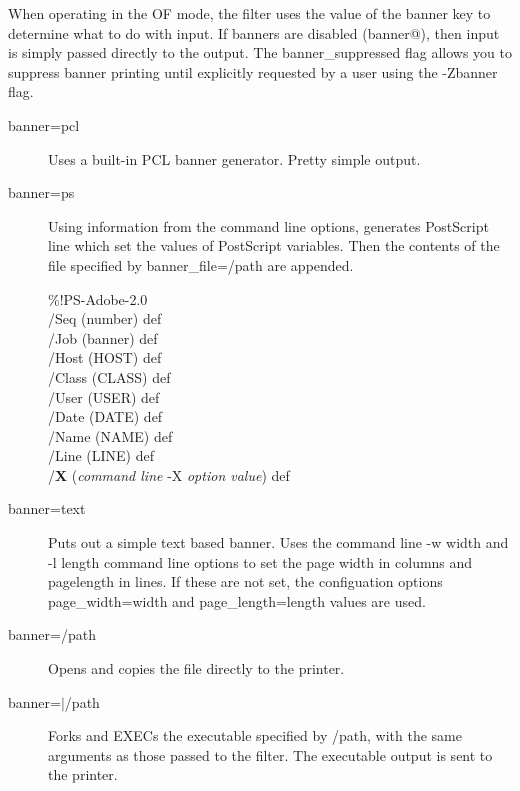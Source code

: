 \documentclass[a4paper]{article}
\begin{document}
When operating in the OF mode,  the filter uses the value of the
banner key to determine what to do with input.  If banners are
disabled
({\ttfamily banner@}),
then input is simply passed directly to the
output.
The banner\_suppressed flag allows you to suppress banner printing
until explicitly requested by a user using the -Zbanner flag.
\begin{description}
\item[{\ttfamily banner=pcl}] \mbox{}

Uses a built-in PCL banner generator.  Pretty simple output.

\item[{\ttfamily  banner=ps }] \mbox{}

Using information from the command line options,  generates
PostScript line which set the values of PostScript variables.
Then the contents of the file specified by
{\ttfamily banner\_file=/path}
are appended.
\begin{tscreen}
\%!PS-Adobe-2.0 \\ 
/Seq (number) def \\ 
/Job (banner) def \\ 
/Host (HOST) def \\ 
/Class (CLASS) def \\ 
/User (USER) def \\ 
/Date (DATE) def \\ 
/Name (NAME) def \\ 
/Line (LINE) def \\ 
/{\bfseries X} ({\itshape command line\/} {\ttfamily -X} {\itshape option value\/}) def 
\end{tscreen}


\item[{\ttfamily banner=text}] \mbox{}

Puts out a simple text based banner.
Uses the command line
{\ttfamily -w width} and {\ttfamily -l length}
command line options to set the page width in columns
and pagelength in lines.
If these are not set,
the configuation options
{\ttfamily page\_width=width}
and
{\ttfamily page\_length=length}
values are used.

\item[{\ttfamily banner=/path}] \mbox{}

Opens and copies the file directly to the printer.

\item[{\ttfamily  banner=$|$/path }] \mbox{}

Forks and EXECs the executable specified by
{\ttfamily /path},
with the same arguments as those passed to the filter.
The executable output is sent to the printer.

\end{description}
\end{document}
